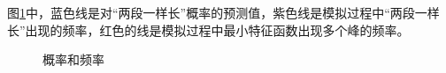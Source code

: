 \documentclass[12pt,a4paper]{article}
\begin{document}
图\ref{f4}中，蓝色线是对“两段一样长”概率的预测值，紫色线是模拟过程中“两段一样长”出现的频率，红色的线是模拟过程中最小特征函数出现多个峰的频率。
\begin{figure}[h]
\centering
{}
\caption{概率和频率}
\label{f4}
\end{figure}

%

%
%
%

%
\end{document}
